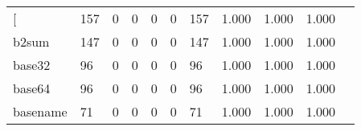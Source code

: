 \begin{longtable}{lp{1.2cm}p{1.2cm}p{1.2cm}p{1.2cm}p{1.2cm}p{1.2cm}p{1.2cm}p{1.2cm}p{1.2cm}p{1.2cm}}
\bottomrule
\endlastfoot
{[}         &                                   157 &                                                  0 &                                                  0 &                                                  0 &                                                  0 &                                                157 &                                              1.000 &                                              1.000 &                                              1.000 \\
b2sum     &                                   147 &                                                  0 &                                                  0 &                                                  0 &                                                  0 &                                                147 &                                              1.000 &                                              1.000 &                                              1.000 \\
base32    &                                    96 &                                                  0 &                                                  0 &                                                  0 &                                                  0 &                                                 96 &                                              1.000 &                                              1.000 &                                              1.000 \\
base64    &                                    96 &                                                  0 &                                                  0 &                                                  0 &                                                  0 &                                                 96 &                                              1.000 &                                              1.000 &                                              1.000 \\
basename  &                                    71 &                                                  0 &                                                  0 &                                                  0 &                                                  0 &                                                 71 &                                              1.000 &                                              1.000 &                                              1.000 \\

\end{longtable}
